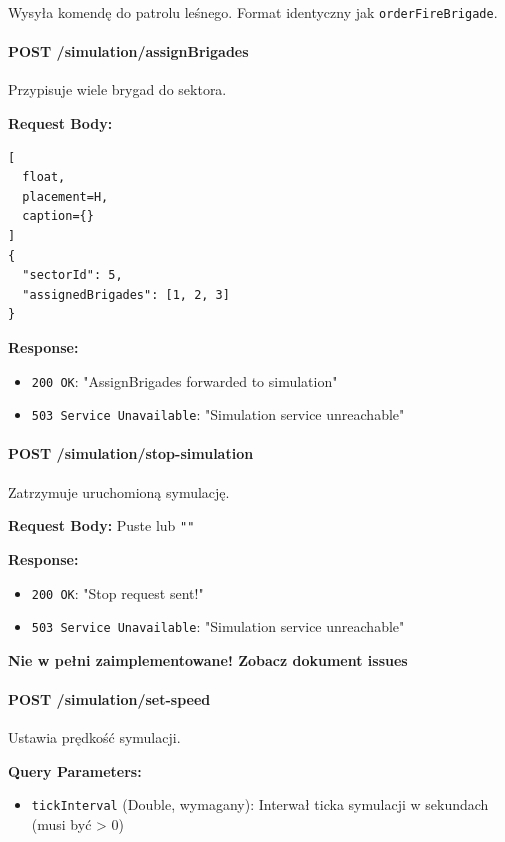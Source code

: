 \documentclass[11pt,a4paper] {article}
\begin{document}
Wysyła komendę do patrolu leśnego. Format identyczny jak \texttt{orderFireBrigade}.

\paragraph{POST /simulation/assignBrigades}

Przypisuje wiele brygad do sektora.

\textbf{Request Body:}
\begin{lstlisting}[
  float,
  placement=H,
  caption={}
]
{
  "sectorId": 5,
  "assignedBrigades": [1, 2, 3]
}
\end{lstlisting}

\textbf{Response:}
\begin{itemize}
    \item \texttt{200 OK}: "AssignBrigades forwarded to simulation"
    \item \texttt{503 Service Unavailable}: "Simulation service unreachable"
\end{itemize}

\paragraph{POST /simulation/stop-simulation}

Zatrzymuje uruchomioną symulację.

\textbf{Request Body:} Puste lub \texttt{""}

\textbf{Response:}
\begin{itemize}
    \item \texttt{200 OK}: "Stop request sent!"
    \item \texttt{503 Service Unavailable}: "Simulation service unreachable"
\end{itemize}

\textbf{Nie w pełni zaimplementowane! Zobacz dokument issues}

\paragraph{POST /simulation/set-speed}

Ustawia prędkość symulacji.

\textbf{Query Parameters:}
\begin{itemize}
    \item \texttt{tickInterval} (Double, wymagany): Interwał ticka symulacji w sekundach (musi być > 0)
\end{itemize}
\end{document}
